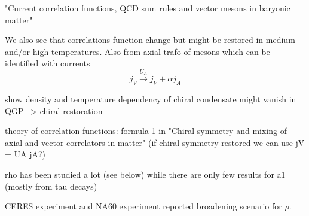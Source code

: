 "Current correlation functions, QCD sum rules and vector mesons in baryonic matter"



We also see that \cite{ChiPart} correlations function change but might be restored in medium and/or high temperatures. Also from axial trafo of mesons which can be identified with currents
\begin{equation}
j_V \overset{U_A}{\longrightarrow} j_V + \alpha j_A
\end{equation}


show density and temperature dependency of chiral condensate 
might vanish in QGP --> chiral restoration

theory of correlation functions: formula 1 in "Chiral symmetry and mixing of axial and vector correlators in matter" (if chiral symmetry restored we can use jV = UA jA?)



rho has been studied a lot (see below) while there are only few results for a1 (mostly from tau decays)

CERES experiment \cite{CERESrho} and NA60 experiment \cite{NA60rho} reported broadening scenario for $\rho$.
